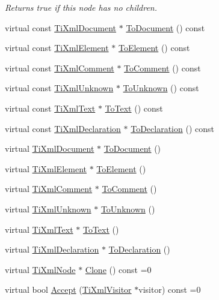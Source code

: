 \begin{DoxyCompactItemize}
\begin{DoxyCompactList}\small\item\em \-Returns true if this node has no children. \end{DoxyCompactList}\item 
virtual const \hyperlink{class_ti_xml_document}{\-Ti\-Xml\-Document} $\ast$ \hyperlink{class_ti_xml_node_a8a4cda4b15c29f64cff419309aebed08}{\-To\-Document} () const 
\item 
virtual const \hyperlink{class_ti_xml_element}{\-Ti\-Xml\-Element} $\ast$ \hyperlink{class_ti_xml_node_a72abed96dc9667ab9e0a2a275301bb1c}{\-To\-Element} () const 
\item 
virtual const \hyperlink{class_ti_xml_comment}{\-Ti\-Xml\-Comment} $\ast$ \hyperlink{class_ti_xml_node_aa0a5086f9eaee910bbfdc7f975e26574}{\-To\-Comment} () const 
\item 
virtual const \hyperlink{class_ti_xml_unknown}{\-Ti\-Xml\-Unknown} $\ast$ \hyperlink{class_ti_xml_node_afd7205cf31d7a376929f8a36930627a2}{\-To\-Unknown} () const 
\item 
virtual const \hyperlink{class_ti_xml_text}{\-Ti\-Xml\-Text} $\ast$ \hyperlink{class_ti_xml_node_a95a46a52c525992d6b4ee08beb14cd69}{\-To\-Text} () const 
\item 
virtual const \hyperlink{class_ti_xml_declaration}{\-Ti\-Xml\-Declaration} $\ast$ \hyperlink{class_ti_xml_node_a9f43e6984fc7d4afd6eb32714c6b7b72}{\-To\-Declaration} () const 
\item 
virtual \hyperlink{class_ti_xml_document}{\-Ti\-Xml\-Document} $\ast$ \hyperlink{class_ti_xml_node_a6a4c8ac28ee7a745d059db6691e03bae}{\-To\-Document} ()
\item 
virtual \hyperlink{class_ti_xml_element}{\-Ti\-Xml\-Element} $\ast$ \hyperlink{class_ti_xml_node_aa65d000223187d22a4dcebd7479e9ebc}{\-To\-Element} ()
\item 
virtual \hyperlink{class_ti_xml_comment}{\-Ti\-Xml\-Comment} $\ast$ \hyperlink{class_ti_xml_node_a383e06a0787f7063953934867990f849}{\-To\-Comment} ()
\item 
virtual \hyperlink{class_ti_xml_unknown}{\-Ti\-Xml\-Unknown} $\ast$ \hyperlink{class_ti_xml_node_a06de5af852668c7e4af0d09c205f0b0d}{\-To\-Unknown} ()
\item 
virtual \hyperlink{class_ti_xml_text}{\-Ti\-Xml\-Text} $\ast$ \hyperlink{class_ti_xml_node_a3ddfbcac78fbea041fad57e5c6d60a03}{\-To\-Text} ()
\item 
virtual \hyperlink{class_ti_xml_declaration}{\-Ti\-Xml\-Declaration} $\ast$ \hyperlink{class_ti_xml_node_a4027136ca820ff4a636b607231b6a6df}{\-To\-Declaration} ()
\item 
virtual \hyperlink{class_ti_xml_node}{\-Ti\-Xml\-Node} $\ast$ \hyperlink{class_ti_xml_node_a4508cc3a2d7a98e96a54cc09c37a78a4}{\-Clone} () const =0
\item 
virtual bool \hyperlink{class_ti_xml_node_acc0f88b7462c6cb73809d410a4f5bb86}{\-Accept} (\hyperlink{class_ti_xml_visitor}{\-Ti\-Xml\-Visitor} $\ast$visitor) const =0
\end{DoxyCompactItemize}
